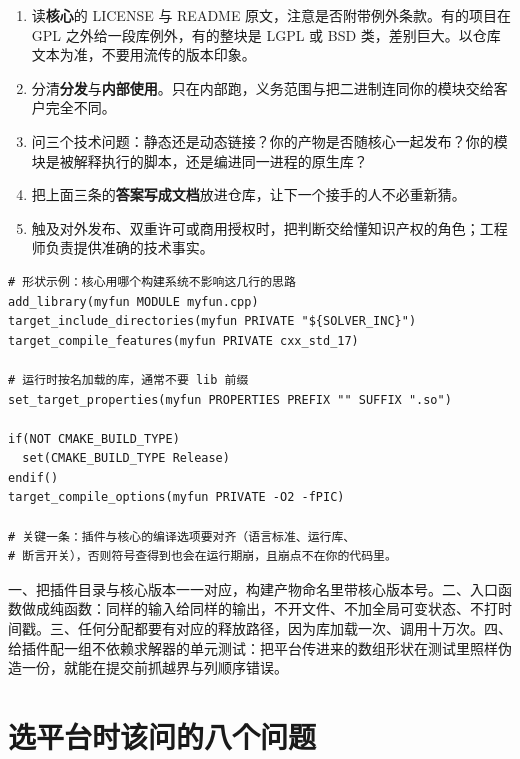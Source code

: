 \documentclass[12pt,a4paper,fontset=fandol]{ctexbook}
\begin{document}
\begin{enumerate}
\item 读\textbf{核心}的 LICENSE 与 README 原文，注意是否附带例外条款。有的项目在 GPL 之外给一段库例外，有的整块是 LGPL 或 BSD 类，差别巨大。以仓库文本为准，不要用流传的版本印象。
\item 分清\textbf{分发}与\textbf{内部使用}。只在内部跑，义务范围与把二进制连同你的模块交给客户完全不同。
\item 问三个技术问题：静态还是动态链接？你的产物是否随核心一起发布？你的模块是被解释执行的脚本，还是编进同一进程的原生库？
\item 把上面三条的\textbf{答案写成文档}放进仓库，让下一个接手的人不必重新猜。
\item 触及对外发布、双重许可或商用授权时，把判断交给懂知识产权的角色；工程师负责提供准确的技术事实。
\end{enumerate}

\begin{lstlisting}[style=cmakestyle,
  caption={把用户函数编成运行时加载的模块：与核心解耦的构建形状},
  label={lst:ch07-userlib-cmake}]
# 形状示例：核心用哪个构建系统不影响这几行的思路
add_library(myfun MODULE myfun.cpp)
target_include_directories(myfun PRIVATE "${SOLVER_INC}")
target_compile_features(myfun PRIVATE cxx_std_17)

# 运行时按名加载的库，通常不要 lib 前缀
set_target_properties(myfun PROPERTIES PREFIX "" SUFFIX ".so")

if(NOT CMAKE_BUILD_TYPE)
  set(CMAKE_BUILD_TYPE Release)
endif()
target_compile_options(myfun PRIVATE -O2 -fPIC)

# 关键一条：插件与核心的编译选项要对齐（语言标准、运行库、
# 断言开关），否则符号查得到也会在运行期崩，且崩点不在你的代码里。
\end{lstlisting}

\begin{bestpractice}[title={插件路线的四条纪律}]
一、把插件目录与核心版本一一对应，构建产物命名里带核心版本号。二、入口函数做成纯函数：同样的输入给同样的输出，不开文件、不加全局可变状态、不打时间戳。三、任何分配都要有对应的释放路径，因为库加载一次、调用十万次。四、给插件配一组不依赖求解器的单元测试：把平台传进来的数组形状在测试里照样伪造一份，就能在提交前抓越界与列顺序错误。
\end{bestpractice}

\section{选平台时该问的八个问题}
\label{sec:ch07-eight-questions}
\end{document}
